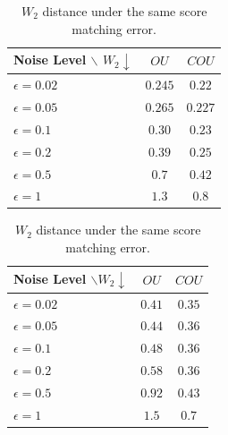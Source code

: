 \documentclass[letterpaper,10pt,reqno]{amsart}
\numberwithin{equation}{section}
\begin{document}
\begin{table}[ht]
    \vspace{-10 pt}
    \centering
    \begin{minipage}{0.45\textwidth}
        \centering
        \begin{tabular}{l c c}
            \toprule
            Noise Level $\backslash$ $W_2\downarrow$ & $OU$ & $COU$ \\
            \midrule
            $\epsilon = 0.02$ ~& $0.245$ & $0.22$\\
            $\epsilon = 0.05$ & $0.265$ & $0.227$\\
            $\epsilon = 0.1$ & $0.30$ & $0.23$\\
            $\epsilon = 0.2$ & $0.39$ & $0.25$\\
            $\epsilon = 0.5$ & $0.7$ & $0.42$\\
            $\epsilon = 1$ & $1.3$ & $0.8$\\
            \bottomrule
        \end{tabular}
        \label{tab:dt02}
    \end{minipage}\hfill
    \begin{minipage}{0.45\textwidth}
        \centering
        
        \begin{tabular}{l c c}
            \toprule
            Noise Level $\backslash W_2\downarrow$ & $OU$ & $COU$ \\
            \midrule
            $\epsilon = 0.02$ ~& $0.41$ & $0.35$\\
            $\epsilon = 0.05$ & $0.44$ & $0.36$\\
            $\epsilon = 0.1$ & $0.48$ & $0.36$\\
            $\epsilon = 0.2$ & $0.58$ & $0.36$\\
            $\epsilon = 0.5$ & $0.92$ & $0.43$\\
            $\epsilon = 1$ & $1.5$ & $0.7$\\
            \bottomrule
        \end{tabular}
        \label{tab:dt05}
    \end{minipage}
    \caption{$W_2$ distance under the same score matching error.}
    \vspace{3 pt}
    \label{tab:global}
\end{table}
\end{document}
